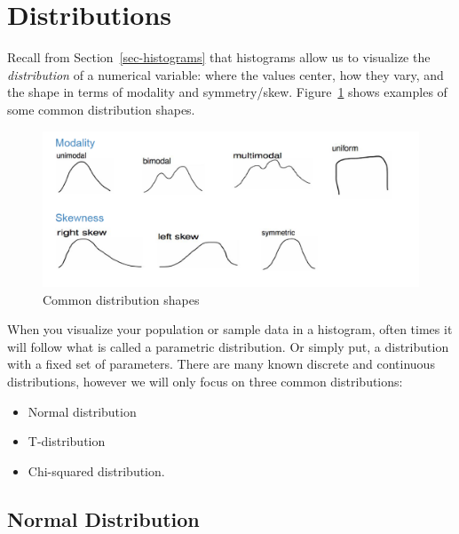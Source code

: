 \documentclass[
  letterpaper,
  DIV=11,
  numbers=noendperiod]{scrreprt}
\providecommand{\tightlist}{%
  \setlength{\itemsep}{0pt}\setlength{\parskip}{0pt}}\usepackage{longtable,booktabs,array}
\theoremstyle{definition}
\theoremstyle{remark}
\begin{document}
\hypertarget{sec-parametric}{%
\section{Distributions}\label{sec-parametric}}

Recall from Section~\ref{sec-histograms} that histograms allow us to
visualize the \emph{distribution} of a numerical variable: where the
values center, how they vary, and the shape in terms of modality and
symmetry/skew. Figure~\ref{fig-distribution} shows examples of some
common distribution shapes.

\begin{figure}

{\centering \includegraphics{images/distribution.png}

}

\caption{\label{fig-distribution}Common distribution shapes}

\end{figure}

When you visualize your population or sample data in a histogram, often
times it will follow what is called a parametric distribution. Or simply
put, a distribution with a fixed set of parameters. There are many known
discrete and continuous distributions, however we will only focus on
three common distributions:

\begin{itemize}
\tightlist
\item
  Normal distribution
\item
  T-distribution
\item
  Chi-squared distribution.
\end{itemize}

\hypertarget{normal-distribution}{%
\subsection{Normal Distribution}\label{normal-distribution}}
\end{document}
